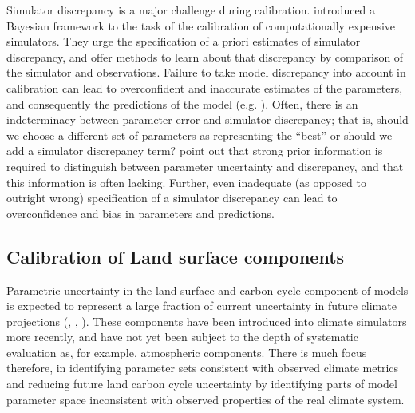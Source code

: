 \documentclass[esd, article]{copernicus} %
\begin{document}
Simulator discrepancy is a major challenge during calibration. \cite{kennedy2001bayesian} introduced a Bayesian framework to the task of the calibration of computationally expensive simulators. They urge the specification of a priori estimates of simulator discrepancy, and offer methods to learn about that discrepancy by comparison of the simulator and observations. Failure to take model discrepancy into account in calibration can lead to overconfident and inaccurate estimates of the parameters, and consequently the predictions of the model (e.g. \cite{higdon2008calibration, brynjarsdottir2014learning}). Often, there is an indeterminacy between parameter error and simulator discrepancy; that is, should we choose a different set of parameters as representing the ``best'' or should we add a simulator discrepancy term? \cite{brynjarsdottir2014learning} point out that strong prior information is required to distinguish between parameter uncertainty and discrepancy, and that this information is often lacking. Further, even inadequate (as opposed to outright wrong) specification of a simulator discrepancy can lead to overconfidence and bias in parameters and predictions.

\subsection{Calibration of Land surface components}

Parametric uncertainty in the land surface and carbon cycle component of models is expected to represent a large fraction of current uncertainty in future climate projections (\cite{booth2012highsensitivity}, \cite{booth2013scenario}, \cite{huntingford2009contributions}). These components have been introduced into climate simulators more recently, and have not yet been subject to the depth of systematic evaluation as, for example, atmospheric components. There is much focus therefore, in identifying parameter sets consistent with observed climate metrics and reducing future land carbon cycle uncertainty by identifying parts of model parameter space inconsistent with observed properties of the real climate system.  
\end{document}
